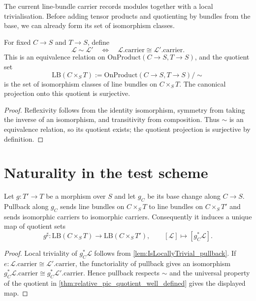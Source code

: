 The current line-bundle carrier records modules together with a local
trivialisation.  Before adding tensor products and quotienting by bundles from
the base, we can already form its set of isomorphism classes.

\begin{theorem}\leanok
  \label{thm:relative_pic_quotient_well_defined}
  For fixed $C\to S$ and $T\to S$, define
  \[
    \mathcal L\sim\mathcal L'
      \quad\Longleftrightarrow\quad
      \mathcal L.\mathrm{carrier}\cong\mathcal L'.\mathrm{carrier}.
  \]
  This is an equivalence relation on
  $\mathrm{OnProduct}(C\to S,T\to S)$, and the quotient set
  \[
    \mathrm{LB}(C\times_S T):=
    \mathrm{OnProduct}(C\to S,T\to S)/\!\sim
  \]
  is the set of isomorphism classes of line bundles on $C\times_S T$.  The
  canonical projection onto this quotient is surjective.
\end{theorem}
\begin{proof}
  \leanok
  Reflexivity follows from the identity isomorphism, symmetry from taking the
  inverse of an isomorphism, and transitivity from composition.  Thus $\sim$ is
  an equivalence relation, so its quotient exists; the quotient projection is
  surjective by definition.
\end{proof}

\section{Naturality in the test scheme}
\label{sec:lbp_pullback_natural}

\begin{theorem}\leanok
  \label{thm:pullback_natural}
  Let $g:T'\to T$ be a morphism over $S$ and let $g_C$ be its base change along
  $C\to S$.  Pullback along $g_C$ sends line bundles on $C\times_S T$ to line
  bundles on $C\times_S T'$ and sends isomorphic carriers to isomorphic
  carriers.  Consequently it induces a unique map of quotient sets
  \[
    g^\sharp:\mathrm{LB}(C\times_S T)\longrightarrow
                    \mathrm{LB}(C\times_S T'),
    \qquad [\mathcal L]\longmapsto[g_C^*\mathcal L].
  \]
\end{theorem}
\begin{proof}
  \leanok
  Local triviality of $g_C^*\mathcal L$ follows from
  \cref{lem:IsLocallyTrivial_pullback}.  If
  $e:\mathcal L.\mathrm{carrier}\cong\mathcal L'.\mathrm{carrier}$, the
  functoriality of pullback gives an isomorphism
  $g_C^*\mathcal L.\mathrm{carrier}\cong g_C^*\mathcal L'.\mathrm{carrier}$.
  Hence pullback respects $\sim$ and the universal property of the quotient in
  \cref{thm:relative_pic_quotient_well_defined} gives the displayed map.
\end{proof}
